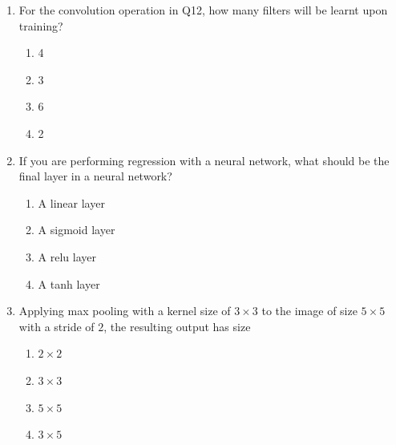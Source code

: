\documentclass[11pt, xcolor=dvipsnames,svgnames,x11names]{article}
\renewcommand{\texttt}[1]{{\ttfamily\color{headerRed}#1}}
\begin{document}
\begin{enumerate}
What is the dimension of an example tensor that can serve as an input to the above convolution layer?

\begin{enumerate}
\item \texttt{torch.Size([2, 1, 5, 6])]}
\item \texttt{torch.Size([2, 6, 32, 32])]}
\item \texttt{torch.Size([2, 3, 5, 6])]}
\item \texttt{torch.Size([2, 4, 32, 32])]}
\end{enumerate}

\item For the convolution operation in Q12, how many filters will be learnt upon training?
\begin{enumerate}
\item 4
\item 3
\item 6
\item 2
\end{enumerate}

\item If you are performing regression with a neural network, what should be the final layer in a neural network?

\begin{enumerate}
\item A linear layer
\item A sigmoid layer
\item A relu layer
\item A tanh layer
\end{enumerate}

\item Applying max pooling with a kernel size of $3\times 3$ to the image of size $5\times 5$ with a stride of $2$, the resulting output has size 

\begin{enumerate}
\item $2\times 2$
\item $3\times 3$
\item $5\times 5$
\item $3\times 5$
\end{enumerate}

\end{enumerate}
\end{document}
